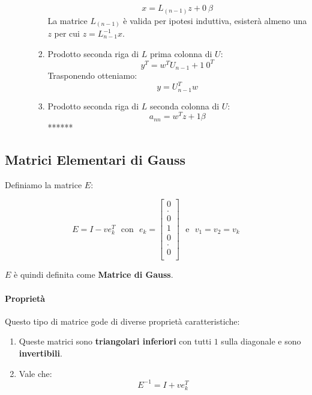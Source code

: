 \documentclass{article}
\begin{document}
\begin{enumerate}
\begin{enumerate}
\begin{enumerate}
           \[ x = L_{(n-1)}z + 0 \: \beta  \]
           La matrice $L_{(n-1)}$ è valida per ipotesi induttiva, esisterà almeno una $z$ per cui $z=L^{-1}_{n-1}x$.
           \item Prodotto seconda riga di $L$ prima colonna di $U$:
           \[ y^{T} = w^{T}U_{n-1} + 1\:0^{T} \]
           Trasponendo otteniamo:
           \[ y = U^{T}_{n-1}w \]
           \item Prodotto seconda riga di $L$ seconda colonna di $U$:
           \[ a_{nn} = w^{T}z + 1\beta \]
           ******
       \end{enumerate}
   \end{enumerate}
\end{enumerate}

\subsection{Matrici Elementari di Gauss}

Definiamo la matrice $E$:

\[ E = I -ve^{T}_{k} \:\:\: \text{con} \:\:\: e_{k} = \begin{bmatrix}
    0 \\
    . \\
    0 \\
    1 \\
    0 \\
    . \\
    0 \\
    
\end{bmatrix}
\:\:\: \text{e} \:\:\: 
v_{1} = v_{2} = v_{k}
\]

$E$ è quindi definita come \textbf{Matrice di Gauss}.

\paragraph{Proprietà} Questo tipo di matrice gode di diverse proprietà caratteristiche:

\begin{enumerate}
    \item Queste matrici sono \textbf{triangolari inferiori} con tutti $1$ sulla diagonale e sono \textbf{invertibili}.
    \item Vale che:
    \[ E^{-1} = I + ve^T_k \]
\end{enumerate}

\newpage
\end{document}
